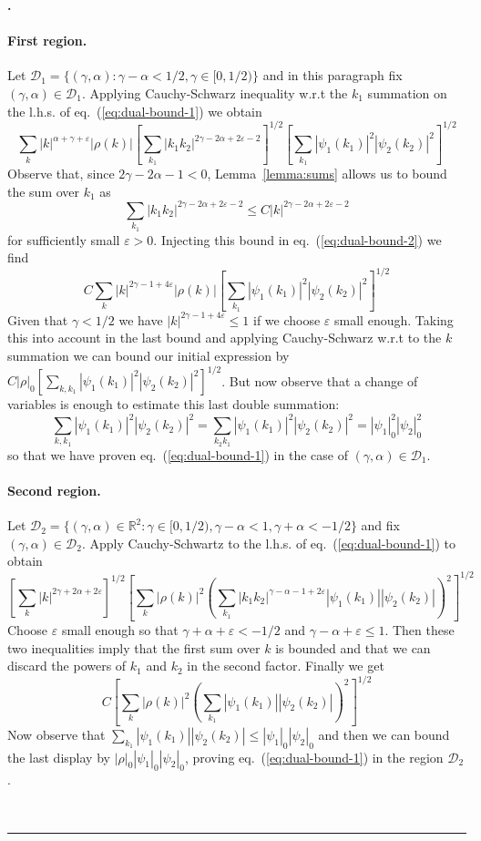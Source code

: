 \documentclass[a4paper,11pt,reqno]{article}
\newcommand{\eps}{\varepsilon}
\newcommand{\RR}{\mathbb{R}}
\newcommand{\DD}{\mathcal{D}}
\newenvironment{proof}[1][Proof]{\textbf{#1.} }{\ \rule{0.5em}{0.5em}}
\begin{document}
\begin{proof}[]
\paragraph{First region.}
Let $\DD_1 = \{(\gamma,\alpha) : \gamma-\alpha < 1/2, \gamma
\in [0,1/2) \}$ and  in this paragraph fix $(\gamma,\alpha) \in \DD_1$.
Applying  Cauchy-Schwarz inequality w.r.t the $k_1$ summation on the
l.h.s. of
eq.~(\ref{eq:dual-bound-1})  we obtain
\begin{equation}
\label{eq:dual-bound-2}
  \sum_{k}  |k|^{\alpha+\gamma+\eps} |\rho(k)|  \left[\sum_{k_1}
    |k_1 k_2|^{2\gamma-2\alpha+2\eps-2}  \right]^{1/2}
  \left[\sum_{k_1 } |\psi_1(k_1)|^2 |\psi_2(k_2)|^2 \right]^{1/2} 
\end{equation}
Observe that, since $2\gamma-2\alpha-1 < 0$, 
Lemma~\ref{lemma:sums} allows us to bound the sum over $k_1$ as
$$
\sum_{k_1}
    |k_1 k_2|^{2\gamma-2\alpha+2\eps-2} \le C |k|^{2\gamma-2\alpha+2\eps-2}
$$
for sufficiently small $\eps > 0$.
Injecting this bound in eq.~(\ref{eq:dual-bound-2}) we find
\begin{equation}
\label{eq:dual-bound-2}
 C  \sum_{k}  |k|^{2\gamma-1+4\eps} |\rho(k)|   \left[\sum_{k_1 }
    |\psi_1(k_1)|^2 |\psi_2(k_2)|^2 \right]^{1/2} 
\end{equation}
Given that $\gamma < 1/2$ we have $|k|^{2\gamma-1+4\eps} \le 1$ if we choose $\eps$ small enough. Taking this
into account in the last bound and applying Cauchy-Schwarz w.r.t to
the $k$ summation we can bound our initial expression by
$ C  |\rho|_0   [\sum_{k, k_1 }
    |\psi_1(k_1)|^2 |\psi_2(k_2)|^2 ]^{1/2} $. But now observe that a
    change of variables is enough to estimate this last double
    summation:
$$
\sum_{k, k_1 }
    |\psi_1(k_1)|^2 |\psi_2(k_2)|^2 = \sum_{k_2  k_1 }
    |\psi_1(k_1)|^2 |\psi_2(k_2)|^2 = |\psi_1|_0^2 |\psi_2|_0^2
$$
so that we have proven eq.~(\ref{eq:dual-bound-1}) in the case of
$(\gamma,\alpha) \in \DD_1$.

\paragraph{Second region.}
Let $\DD_2 = \{(\gamma,\alpha)\in\RR^2 : \gamma \in[ 0,1/2),  \gamma-\alpha < 1, \gamma
+\alpha < -1/2 \}$ and fix $(\gamma,\alpha) \in \DD_2$.
Apply Cauchy-Schwartz to the l.h.s. of eq.~(\ref{eq:dual-bound-1}) to obtain
$$
\left[\sum_k |k|^{2\gamma+2\alpha+2\eps}\right]^{1/2}
\left[\sum_k |\rho(k)|^2 \left(\sum_{k_1} 
    |k_1 k_2|^{\gamma-\alpha-1+2\eps} |\psi_1(k_1)|  |\psi_2(k_2)| \right)^2\right]^{1/2}
$$
Choose $\eps$ small enough so that $\gamma+\alpha+\eps < -1/2$ and $\gamma-\alpha+\eps \le 1$. Then these two inequalities imply that the first sum over $k$ is bounded and that we can discard the powers of $k_1$ and $k_2$ in the second factor. Finally we get
$$
C
\left[\sum_k |\rho(k)|^2 \left(\sum_{k_1} |\psi_1(k_1)|  |\psi_2(k_2)| \right)^2\right]^{1/2}
$$
Now observe that $ \sum_{k_1} |\psi_1(k_1)|  |\psi_2(k_2)| \le
|\psi_1|_0 |\psi_2|_0$ and then we can bound the last display by
$
|\rho|_0 |\psi_1|_0 |\psi_2|_0
$, proving eq.~(\ref{eq:dual-bound-1}) in the region $\DD_2$.


\end{proof}
\end{document}
